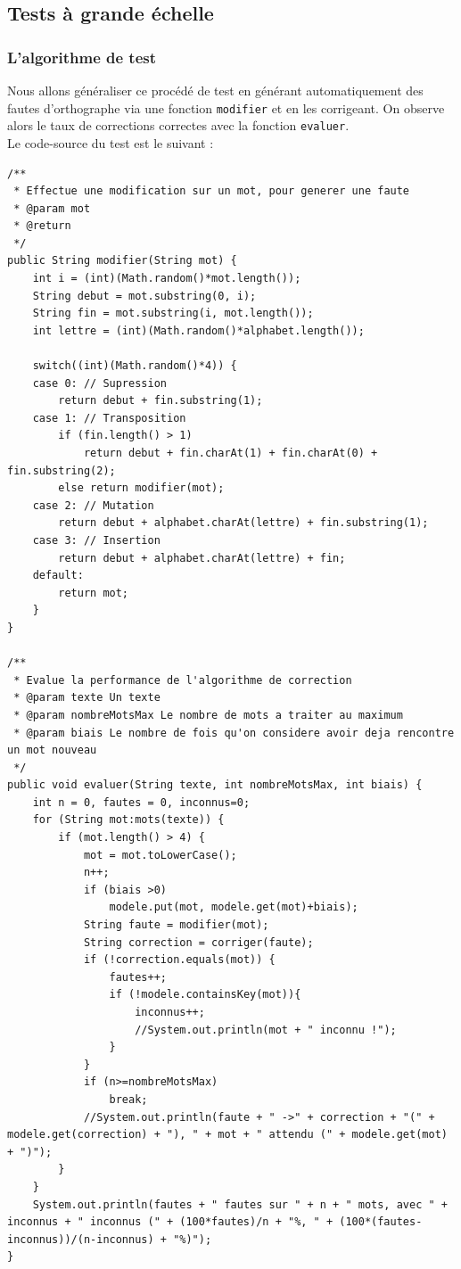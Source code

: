 \documentclass[10pt,a4paper]{article}
\begin{document}
\subsection{Tests à grande échelle}

\subsubsection{L'algorithme de test}

Nous allons généraliser ce procédé de test en générant automatiquement des fautes d'orthographe via une fonction \verb!modifier! et en les corrigeant. On observe alors le taux de corrections correctes avec la fonction \verb!evaluer!.\\

Le code-source du test est le suivant : 

\begin{lstlisting}
/**
 * Effectue une modification sur un mot, pour generer une faute
 * @param mot
 * @return
 */
public String modifier(String mot) {       
    int i = (int)(Math.random()*mot.length());
    String debut = mot.substring(0, i);
    String fin = mot.substring(i, mot.length());
    int lettre = (int)(Math.random()*alphabet.length());
    
    switch((int)(Math.random()*4)) {
    case 0: // Supression
        return debut + fin.substring(1);
    case 1: // Transposition
        if (fin.length() > 1)
            return debut + fin.charAt(1) + fin.charAt(0) + fin.substring(2);
        else return modifier(mot);
    case 2: // Mutation
        return debut + alphabet.charAt(lettre) + fin.substring(1);
    case 3: // Insertion
        return debut + alphabet.charAt(lettre) + fin;
    default:
        return mot;
    }        
}

/**
 * Evalue la performance de l'algorithme de correction
 * @param texte Un texte 
 * @param nombreMotsMax Le nombre de mots a traiter au maximum
 * @param biais Le nombre de fois qu'on considere avoir deja rencontre un mot nouveau
 */
public void evaluer(String texte, int nombreMotsMax, int biais) {
    int n = 0, fautes = 0, inconnus=0;
    for (String mot:mots(texte)) {
        if (mot.length() > 4) {
            mot = mot.toLowerCase();
            n++;
            if (biais >0)
                modele.put(mot, modele.get(mot)+biais);
            String faute = modifier(mot);
            String correction = corriger(faute);
            if (!correction.equals(mot)) {
                fautes++;
                if (!modele.containsKey(mot)){
                    inconnus++;
                    //System.out.println(mot + " inconnu !");
                }
            }
            if (n>=nombreMotsMax)
                break;
            //System.out.println(faute + " ->" + correction + "(" + modele.get(correction) + "), " + mot + " attendu (" + modele.get(mot) + ")");
        }
    }
    System.out.println(fautes + " fautes sur " + n + " mots, avec " + inconnus + " inconnus (" + (100*fautes)/n + "%, " + (100*(fautes-inconnus))/(n-inconnus) + "%)");
}
\end{lstlisting}
\end{document}
